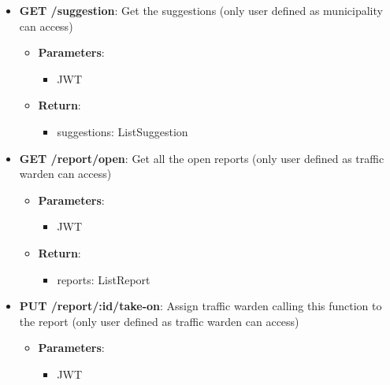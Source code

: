 \documentclass{article}
\begin{document}
\begin{itemize}
\begin{itemize}
\begin{itemize}
\begin{itemize}
							\item to: Date \textit{analyze data only until this date}
						\end{itemize}
					\item \textbf{Return}:
						\begin{itemize}
							\item ranking: List\textlangle{}String\textrangle{} \textit{ordered list of license plate}
						\end{itemize}
				\end{itemize}
			\item \textbf{GET /suggestion}:
				Get the suggestions (only user defined as municipality can access)
				\begin{itemize}
					\item \textbf{Parameters}:
						\begin{itemize}
							\item JWT
						\end{itemize}
					\item \textbf{Return}:
						\begin{itemize}
							\item suggestions: List\textlangle{}Suggestion\textrangle{}
						\end{itemize}
				\end{itemize}
			\item \textbf{GET /report/open}:
				Get all the open reports (only user defined as traffic warden can access)
				\begin{itemize}
					\item \textbf{Parameters}:
						\begin{itemize}
							\item JWT
						\end{itemize}
					\item \textbf{Return}:
						\begin{itemize}
							\item reports: List\textlangle{}Report\textrangle{}
						\end{itemize}
				\end{itemize}
			\item \textbf{PUT /report/:id/take-on}:
				Assign traffic warden calling this function to the report (only user defined as traffic warden can access)
				\begin{itemize}
					\item \textbf{Parameters}:
						\begin{itemize}
							\item JWT

\end{itemize}
\end{itemize}
\end{itemize}
\end{itemize}
\end{document}
